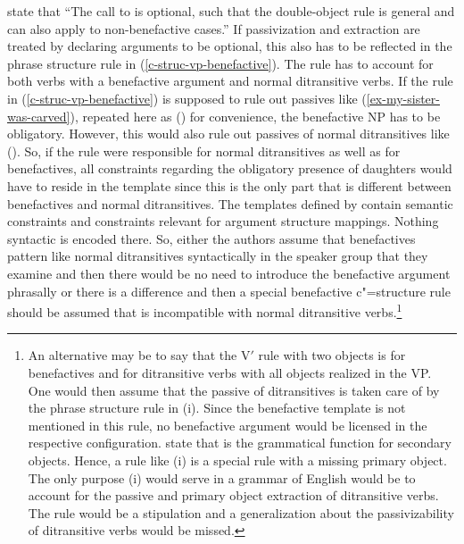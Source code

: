 \citet[]{AGT2014a} state that ``The call to  is optional, such
that the double-object rule is general and can also apply to non-benefactive cases.'' If
passivization and extraction are treated by declaring arguments to be optional, this also has to be
reflected in the phrase structure rule in (\ref{c-struc-vp-benefactive}). The rule has to account
for both verbs with a benefactive argument and normal ditransitive verbs.
If the rule in (\ref{c-struc-vp-benefactive}) is supposed to rule out passives like
(\ref{ex-my-sister-was-carved}), repeated here as () for convenience, the benefactive NP has to be obligatory. 
\z
However, this would also rule out passives of normal ditransitives like ().
\z
\largerpage
So, if the rule were responsible for normal ditransitives as well as for benefactives, all
constraints regarding the obligatory presence of daughters would have to reside in the template
since this is the only part that is different between benefactives and normal ditransitives. The
templates defined by \citet{AGT2014a} contain semantic constraints and constraints relevant for
argument structure mappings. Nothing syntactic is encoded there. So, either the authors assume that
benefactives pattern like normal ditransitives syntactically in the speaker group that they
examine and then there would be no need to introduce the benefactive argument phrasally or there is
a difference and then a special benefactive c"=structure rule should be assumed that is incompatible
with normal ditransitive verbs.\footnote{%
 An alternative may be to say that the V$'$ rule with two objects is for benefactives and for
 ditransitive verbs with all objects realized in the VP. One would then assume that the passive of
 ditransitives is taken care of by the phrase structure rule in (i).
\ea\label{c-struc-vp-ditransitive-passive}
\z
Since the benefactive template is not mentioned in this rule, no benefactive argument would be
licensed in the respective configuration. \citet*{BATW2015a} state that \objtheta is the grammatical
function for secondary objects. Hence, a rule like (i) is a special rule with a missing primary
object. The only purpose (i) would serve in a grammar of English would be to account for the passive
and primary object extraction of ditransitive verbs. The rule would be a stipulation and a
generalization about the passivizability of ditransitive verbs would be missed.
}



